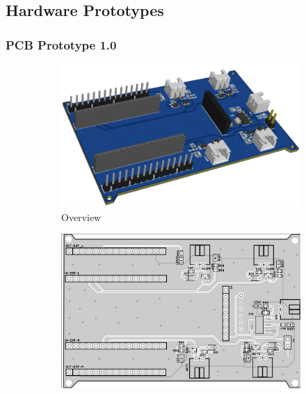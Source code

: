 \subsection{Hardware Prototypes}
\label{app:pcb-prototypes}

\subsubsection{PCB Prototype 1.0}

\begin{figure}[H]
    \centering
    \begin{subfigure}[b]{0.45\linewidth}
        \centering
        \includegraphics[width=\linewidth]{img/proto-pcb1.png}
        \caption{Overview}
        \label{fig:pcb1-overview}
    \end{subfigure}
    \hfill
    \vfill
    \begin{subfigure}[b]{0.4\linewidth}
        \centering
        \includegraphics[width=\linewidth]{img/PCBit1_front.png}

\end{subfigure}
\end{figure}
